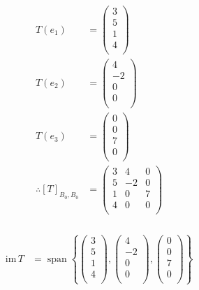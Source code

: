 \documentclass[fleqn, a4paper]{amsart}
\DeclareMathOperator{\vspan}{\mathrm{span}} %
\theoremstyle{definition}
\theoremstyle{theorem}
\theoremstyle{remark}
\newcommand{\im}{\mathrm{im}\,}
\numberwithin{corollary}{theorem}
\numberwithin{equation}{theorem}
\begin{document}
\begin{multicols}{1}
\begin{align*}
	T(e_1) &= 
		\begin{pmatrix}
			3\\
			5\\
			1\\
			4\\
		\end{pmatrix}\\
	T(e_2) &= 
		\begin{pmatrix}
			4\\
			-2\\
			0\\
			0\\
		\end{pmatrix}\\
	T(e_3) &= 
		\begin{pmatrix}
			0\\
			0\\
			7\\
			0\\
		\end{pmatrix}\\
	\therefore [T]_{B_0, B_0} &= 
		\begin{pmatrix}
			3 & 4 & 0\\
			5 & -2 & 0\\
			1 & 0 & 7\\
			4 & 0 & 0\\
		\end{pmatrix}
\end{align*}

\subsubsection{}

\begin{align*}
	\im T &= \vspan
		\left\lbrace
			\begin{pmatrix}
				3\\
				5\\
				1\\
				4\\
			\end{pmatrix}
			,
			\begin{pmatrix}
				4\\
				-2\\
				0\\
				0\\
			\end{pmatrix}
			,
			\begin{pmatrix}
				0\\
				0\\
				7\\
				0\\
			\end{pmatrix}
		\right\rbrace
\end{align*}


\end{multicols}
\end{document}
